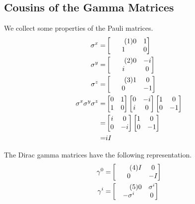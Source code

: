 \documentclass[]{article}
\newcommand\numberthis{\addtocounter{equation}{1}\tag{\theequation}}
\begin{document}
\subsection{Cousins of the Gamma Matrices}
We collect some properties of the Pauli matrices.
\begin{align*}
	\sigma^x =& \begin{bmatrix} \numberthis \label{eq:pauli:x}
		0&1\\
		1&0
	\end{bmatrix}\\
	\sigma^y =& \begin{bmatrix} \numberthis \label{eq:pauli:y}
		0&-i\\
		i&0
	\end{bmatrix}\\
	\sigma^z =& \begin{bmatrix} \numberthis \label{eq:pauli:z}
		1&0\\
		0&-1
	\end{bmatrix}\\
	\sigma^x \sigma^y \sigma^z =& \begin{bmatrix} 
		0&1\\
		1&0
	\end{bmatrix} \begin{bmatrix} 
		0&-i\\
		i&0
	\end{bmatrix}\begin{bmatrix} 
		1&0\\
		0&-1
	\end{bmatrix}\\
	=& \begin{bmatrix}
		i&0\\
		0&-i\\
	\end{bmatrix}\begin{bmatrix} 
		1&0\\
		0&-1
	\end{bmatrix}\\
	=& i I
\end{align*}

The Dirac gamma matrices have the following representation.
\begin{align*}
	\gamma^0 =& \begin{bmatrix} \numberthis \label{eq:gamma:0}
	I&0\\
	0&-I
\end{bmatrix}\\
\gamma^i =& \begin{bmatrix}  \numberthis \label{eq:gamma:i}
	0&\sigma^i\\
	-\sigma^i&0
\end{bmatrix}	
\end{align*}
\end{document}
